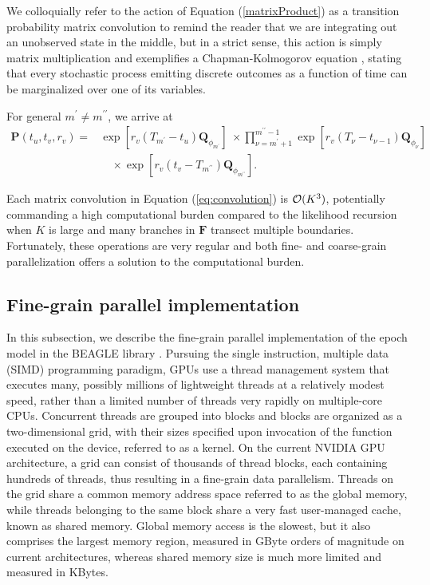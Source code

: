 \par

We colloquially refer to the action of Equation (\ref{matrixProduct}) as a transition probability matrix convolution to remind the reader that we are integrating out an unobserved state in the middle, but in a strict sense, this action is simply matrix multiplication and exemplifies a Chapman-Kolmogorov equation \citep[see, e.g.,][]{Feller1}, %
stating that every stochastic process emitting discrete outcomes as a function of time can be marginalized over one of its variables.

For general $m^{\prime} \neq m^{\prime\prime}$, we arrive at
\begin{align}
\mathbf{P}(t_u, t_v, r_v)
= 
& \exp[ r_v ( T_{m^{\prime}} - t_u ) \mathbf{Q}_{\phi_{m^{\prime}}}] \ \times %
\prod_{
\nu = m^{\prime} + 1
}^{
m^{\prime\prime} - 1
}
\exp[ r_v ( T_{\nu} - t_{\nu - 1} ) \mathbf{Q}_{\phi_{\nu}}]
 \nonumber \\
&
\quad \times
\exp[ r_v ( t_v - T_{m^{\prime\prime}} ) \mathbf{Q}_{\phi_{m^{\prime\prime}}}] 
.
\label{eq:convolution}
\end{align}

Each matrix convolution in Equation (\ref{eq:convolution}) is ${\cal O}(K^3)$, potentially commanding a high computational burden compared to the likelihood recursion when $K$ is large and many branches in $\mathbf{F}$ transect multiple boundaries.  
Fortunately, these operations are very regular and both fine- and coarse-grain parallelization offers a solution to the computational burden.

\subsection{Fine-grain parallel implementation\label{sub:fine_grain}}

In this subsection, we describe the fine-grain parallel implementation of the epoch model in the BEAGLE library \citep{Ayres2012}.
Pursuing the single instruction, multiple data (SIMD) programming paradigm, GPUs use a thread management system that executes many, possibly millions of lightweight threads at a relatively modest speed, rather than a limited number of threads very rapidly on multiple-core CPUs.
Concurrent threads are grouped into blocks and blocks are organized as a two-dimensional grid, with their sizes specified upon invocation of the function executed on the device, referred to as a kernel. 
On the current NVIDIA GPU architecture, a grid can consist of thousands of thread blocks, each containing hundreds of threads, thus resulting in a fine-grain data parallelism.
Threads on the grid share a common memory address space referred to as the global memory, while threads belonging to the same block share a very fast user-managed cache, known as shared memory.  
Global memory access is the slowest, but it also comprises the largest memory region, measured in GByte orders of magnitude on current architectures, whereas shared memory size is much more limited and measured in KBytes.

